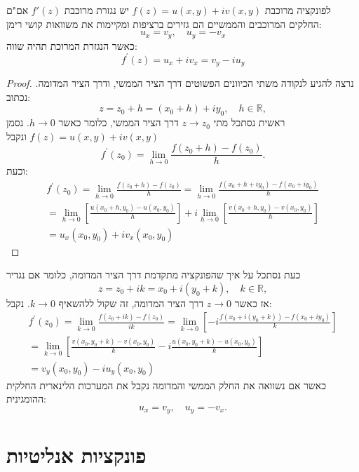 \documentclass{tstextbook}
\begin{document}
\begin{theorem}
לפונקציה מרוכבת \(f(z)=u(x,y)+iv(x,y)\) יש נגזרת מרוכבת \(f'(z)\) אם"ם החלקים המרוכבים והממשיים הם גזירים ברציפות ומקיימות את משוואות קושי רימן:
$$u_{x}=v_{y},\quad u_{y}=-v_{x}$$
כאשר הנגזרת המרוכת תהיה שווה:
$$f^{\prime}(z)=u_{x}+i v_{x}=v_{y}-i u_{y}$$

\end{theorem}
\begin{proof}
נרצה להגיע לנקודה משתי הכיוונים הפשוטים דרך הציר הממשי, ודרך הציר המדומה. נכתוב:
$$z=z_{0}+h=(x_{0}+h)+i y_{0},\quad h\in\mathbb{R},$$
ראשית נסתכל מתי \(z\to z_{0}\) דרך הציר הממשי, כלומר כאשר \(h\to 0\).
נסמן \(f(z)=u(x,y)+iv(x,y)\) ונקבל $$f^{\prime}(z_{0})=\operatorname*{lim}_{h\to0}{\frac{f(z_{0}+h)-f(z_{0})}{h}}.$$
וכעת:
\begin{gather*}{f^{\prime}(z_{0})=\operatorname*{lim}_{h\to0}{\frac{f(z_{0}+h)-f(z_{0})}{h}}=\operatorname*{lim}_{h\to0}{\frac{f(x_{0}+h+i y_{0})-f(x_{0}+i y_{0})}{h}}}\\ {=\operatorname*{lim}_{h\to0}\left[{\frac{u\left(x_{0}+h,y_{0}\right)-u\left(x_{0},y_{0}\right)}{h}}\right]+i\operatorname*{lim}_{h\to0}\left[{\frac{v\left(x_{0}+h,y_{0}\right)-v\left(x_{0},y_{0}\right)}{h}}\right]}\\ {=u_{x}(x_{0},y_{0})+i v_{x}(x_{0},y_{0})}\end{gather*}

\end{proof}
כעת נסתכל על איך שהפונקציה מתקדמת דרך הציר המדומה, כלומר אם נגדיר
$$z=z_{0}+i k=x_{0}+i(y_{0}+k),\quad k\in\mathbb{R},$$
אז כאשר \(z\to 0\) דרך הציר המדומה, זה שקול ללהשאיף \(k\to 0\). נקבל:
\begin{gather*}{f^{\prime}(z_{0})=\operatorname*{lim}_{k\to0}{\frac{f(z_{0}+i k)-f(z_{0})}{i k}}=\operatorname*{lim}_{k\to0}\left[-i{\frac{f(x_{0}+i(y_{0}+k))-f(x_{0}+i y_{0})}{k}}\right]}\\ {=\operatorname*{lim}_{k\to0}\left[{\frac{v\left(x_{0},y_{0}+k\right)-v\left(x_{0},y_{0}\right)}{k}}-i{\frac{u\left(x_{0},y_{0}+k\right)-u\left(x_{0},y_{0}\right)}{k}}\right]}\\ {=v_{y}(x_{0},y_{0})-i u_{y}(x_{0},y_{0})}\end{gather*}
כאשר אם נשוואה את החלק הממשי והמדומה נקבל את המערכות הלינארית החלקית ההומגינית:
$$u_{x}=v_{y},\quad u_{y}=-v_{x}.$$

\section{פונקציות אנליטיות}
\end{document}
